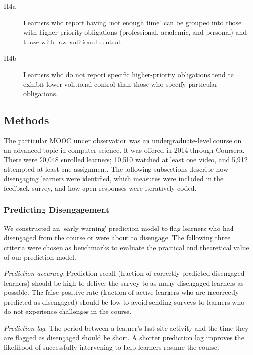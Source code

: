 \documentclass{sigchi}\usepackage[]{graphicx}\usepackage[]{color}
\begin{document}
\begin{description}
  \item[H4a] Learners who report having `not enough time' can be grouped into those with higher priority obligations (professional, academic, and personal) and those with low volitional control.
  \item[H4b] Learners who do not report specific higher-priority obligations tend to exhibit lower volitional control than those who specify particular obligations.
\end{description}  

\subsection{Methods}

The particular MOOC under observation was an undergraduate-level course on an advanced topic in computer science. It was offered in 2014 through Coursera. There were 20,048 enrolled learners; 10,510 watched at least one video, and 5,912 attempted at least one assignment. The following subsections describe how disengaging learners were identified, which measures were included in the feedback survey, and how open responses were iteratively coded.

\subsubsection{Predicting Disengagement}

We constructed an `early warning' prediction model to flag learners who had disengaged from the course or were about to disengage. The following three criteria were chosen as benchmarks to evaluate the practical and theoretical value of our prediction model.%

\textit{Prediction accuracy}: Prediction recall (fraction of correctly predicted disengaged learners) should be high to deliver the survey to as many disengaged learners as possible. The false positive rate (fraction of active learners who are incorrectly predicted as disengaged) should be low to avoid sending surveys to learners who do not experience challenges in the course.

\textit{Prediction lag}: The period between a learner's last site activity and the time they are flagged as disengaged should be short. A shorter prediction lag improves the likelihood of successfully intervening to help learners resume the course.
\end{document}

